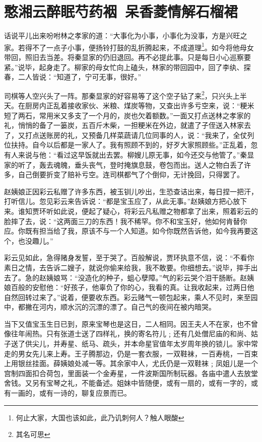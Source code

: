\documentclass[12pt,oneside]{book}
\begin{document}
 
\chapter{憨湘云醉眠芍药裀~呆香菱情解石榴裙}
话说平儿出来吩咐林之孝家的道：“大事化为小事，小事化为没事，方是兴旺之家。若得不了一点子小事，便扬铃打鼓的乱折腾起来，不成道理\footnote{何止大家，大国也该如此，此乃讥刺何人？触人眼酸}。如今将他母女带回，照旧去当差。将秦显家的仍旧退回。再不必提此事。只是每日小心巡察要紧。”说毕，起身走了。柳家的母女忙向上磕头，林家的带回园中，回了李纨、探春，二人皆说：“知道了，宁可无事，很好。”

司棋等人空兴头了一阵。那秦显家的好容易等了这个空子钻了来\footnote{其名可思}，只兴头上半天。在厨房内正乱着接收家伙、米粮、煤炭等物，又查出许多亏空来，说：“粳米短了两石，常用米又多支了一个月的，炭也欠着额数。”一面又打点送林之孝家的礼，悄悄的备了一篓炭，五百斤木柴，一担粳米在外边，就遣了子侄送入林家去了，又打点送账房的礼，又预备几样菜蔬请几位同事的人，说：“我来了，全仗列位扶持。自今以后都是一家人了。我有照顾不到的，好歹大家照顾些。”正乱着，忽有人来说与他：“看过这早饭就出去罢。柳嫂儿原无事，如今还交与他管了。”秦显家的听了，轰去魂魄，垂头丧气，登时掩旗息鼓，卷包而出。送人之物白丢了许多，自己倒要折变了赔补亏空。连司棋都气了个倒仰，无计挽回，只得罢了。

赵姨娘正因彩云私赠了许多东西，被玉钏儿吵出，生恐查诘出来，每日捏一把汗，打听信儿。忽见彩云来告诉说：“都是宝玉应了，从此无事。”赵姨娘方把心放下来。谁知贾环听如此说，便起了疑心，将彩云凡私赠之物都拿了出来，照着彩云的脸摔了去，说：“这两面三刀的东西！我不稀罕。你不和宝玉好，他如何肯替你应。你既有担当给了我，原该不与一个人知道。如今你既然告诉他，如今我再要这个，也没趣儿。”

彩云见如此，急得赌身发誓，至于哭了。百般解说，贾环执意不信，说：“不看你素日之情，去告诉二嫂子，就说你偷来给我，我不敢要。你细想去。”说毕，摔手出去了。急的赵姨娘骂：“没造化的种子，蛆心孽障。”气的彩云哭个泪干肠断。赵姨娘百般的安慰他：“好孩子，他辜负了你的心，我看的真。让我收起来，过两日他自然回转过来了。”说着，便要收东西。彩云赌气一顿包起来，乘人不见时，来至园中，都撇在河内，顺水沉的沉漂的漂了。自己气的夜间在被内暗哭。

当下又值宝玉生日已到，原来宝琴也是这日，二人相同。因王夫人不在家，也不曾像往年闹热。只有张道士送了四样礼，换的寄名符儿﹔还有几处僧尼庙的和尚、姑子送了供尖儿，并寿星、纸马、疏头，并本命星官值年太岁周年换的锁儿。家中常走的男女先儿来上寿。王子腾那边，仍是一套衣服，一双鞋袜，一百寿桃，一百束上用银丝挂面。薛姨娘处减一等。其余家中人，尤氏仍是一双鞋袜﹔凤姐儿是一个宫制四面扣合荷包，里面装一个金寿星，一件波斯国所制玩器。各庙中遣人去放堂舍钱。又另有宝琴之礼，不能备述。姐妹中皆随便，或有一扇的，或有一字的，或有一画的，或有一诗的，聊复应景而已。
\end{document}
